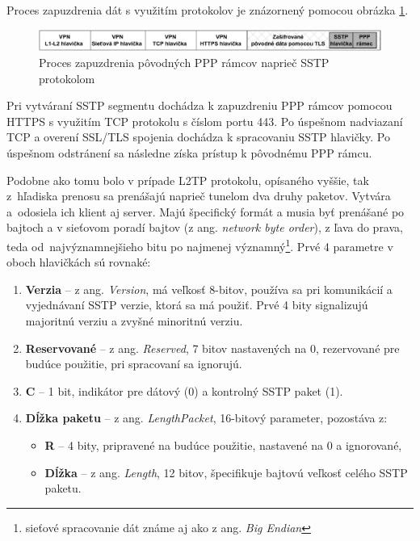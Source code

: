 Proces zapuzdrenia dát s využitím protokolov je znázornený pomocou obrázka \ref{sstpprotocolstack}. 
\begin{figure}[!h]
	\centering
	\includegraphics[width=1\textwidth]{figures/sstpprotocolstack}
	\caption{Proces zapuzdrenia pôvodných PPP rámcov naprieč SSTP protokolom}
	\label{sstpprotocolstack}
\end{figure}
Pri vytváraní SSTP segmentu dochádza k zapuzdreniu PPP rámcov pomocou HTTPS s využitím TCP protokolu s číslom portu 443. Po úspešnom nadviazaní TCP a overení SSL/TLS spojenia dochádza k spracovaniu SSTP hlavičky. Po úspešnom odstránení sa následne získa prístup k pôvodnému PPP rámcu.   

Podobne ako tomu bolo v prípade L2TP protokolu, opísaného vyššie, tak z~hľadiska prenosu sa prenášajú naprieč tunelom dva druhy paketov. Vytvára a~odosiela ich klient aj server. Majú špecifický formát a musia byť prenášané po bajtoch a v sieťovom poradí bajtov (z ang. \textit{network byte order}), z ľava do prava, teda od~najvýznamnejšieho bitu po najmenej významný\footnote{sieťové spracovanie dát známe aj ako z ang. \textit{Big Endian}}. Prvé 4 parametre v oboch hlavičkách sú rovnaké: 
\begin{enumerate}
	\item{\textbf{Verzia}} -- z ang. \textit{Version}, má veľkosť 8-bitov, používa sa pri komunikácií a vyjednávaní SSTP verzie, ktorá sa má použiť. Prvé 4 bity signalizujú majoritnú verziu a zvyšné minoritnú verziu. 
	\item{\textbf{Reservované}} -- z ang. \textit{Reserved}, 7 bitov nastavených na 0, rezervované pre budúce použitie, pri spracovaní sa ignorujú.
	\item{\textbf{C}} -- 1 bit, indikátor pre dátový (0) a kontrolný SSTP paket (1). 
	\item{\textbf{Dĺžka paketu}} -- z ang. \textit{LengthPacket}, 16-bitový parameter, pozostáva z:
		\begin{itemize}
			\item{\textbf{R}} -- 4 bity, pripravené na budúce použitie, nastavené na 0 a ignorované,
			\item{\textbf{Dĺžka}} -- z ang. \textit{Length}, 12 bitov, špecifikuje bajtovú veľkosť celého SSTP paketu.
		\end{itemize}
\end{enumerate}
 
